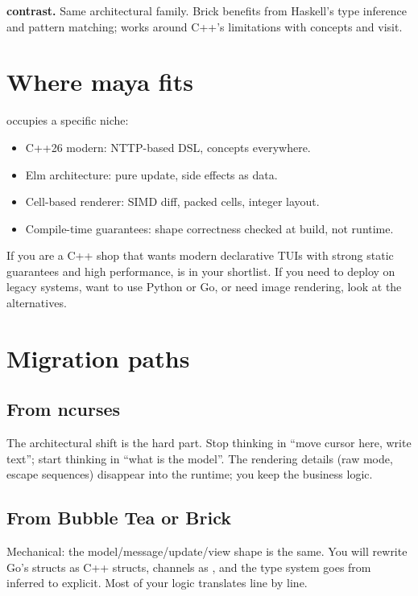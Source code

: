 \textbf{\maya{} contrast.} Same architectural family. Brick
benefits from Haskell's type inference and pattern matching;
\maya{} works around C++'s limitations with concepts and visit.

\section{Where maya fits}

\maya{} occupies a specific niche:

\begin{itemize}[leftmargin=*]
  \item C++26 modern: NTTP-based DSL, concepts everywhere.
  \item Elm architecture: pure update, side effects as data.
  \item Cell-based renderer: SIMD diff, packed cells, integer
    layout.
  \item Compile-time guarantees: shape correctness checked at
    build, not runtime.
\end{itemize}

If you are a C++ shop that wants modern declarative TUIs with
strong static guarantees and high performance, \maya{} is in
your shortlist. If you need to deploy on legacy systems, want
to use Python or Go, or need image rendering, look at the
alternatives.

\section{Migration paths}

\subsection*{From ncurses}

The architectural shift is the hard part. Stop thinking in
``move cursor here, write text''; start thinking in ``what is
the model''. The rendering details (raw mode, escape sequences)
disappear into the runtime; you keep the business logic.

\subsection*{From Bubble Tea or Brick}

Mechanical: the model/message/update/view shape is the same.
You will rewrite Go's structs as C++ structs, channels as
, and the type system goes from inferred to
explicit. Most of your logic translates line by line.

